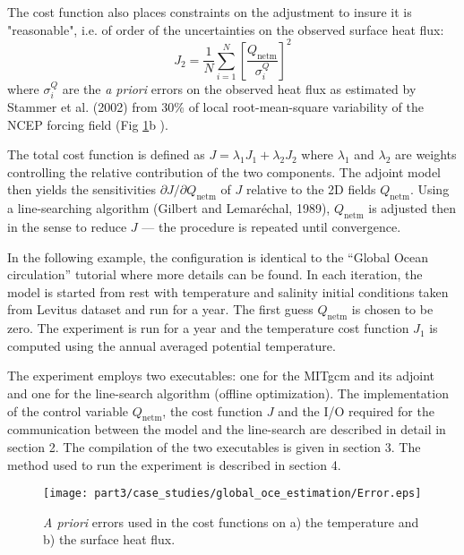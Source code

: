The cost function also places constraints on the adjustment to insure it is
"reasonable", i.e. of order of the uncertainties on the observed surface heat
flux: 
\begin{equation}
J_2 = \frac{1}{N} \sum_{i=1}^N \left[\frac{Q_\mathrm{netm}}{\sigma^Q_i} \right]^2
\end{equation}
where $\sigma^Q_i$ are the {\it a priori} errors on the observed heat flux as
estimated by Stammer et al. (2002) from 30\% of local root-mean-square
variability of the NCEP forcing field (Fig \ref{Error}b ).

The total cost function is defined as $J=\lambda_1 J_1+ \lambda_2 J_2$ where
$\lambda_1$ and $\lambda_2$ are weights controlling the relative contribution
of the two components. The adjoint model then yields the sensitivities
$\partial J/\partial Q_\mathrm{netm}$ of $J$ relative to the 2D fields
$Q_\mathrm{netm}$. Using a line-searching algorithm (Gilbert and
Lemar\'{e}chal, 1989), $Q_\mathrm{netm}$ is adjusted then in the sense to
reduce $J$ --- the procedure is repeated until convergence.

In the following example, the configuration is identical to the ``Global Ocean
circulation'' tutorial where more details can be found. In each iteration, the
model is started from rest with temperature and salinity initial conditions
taken from Levitus dataset and run for a year. The first guess
$Q_\mathrm{netm}$ is chosen to be zero. The experiment is run for a year
and the temperature cost function $J_1$ is computed using the annual averaged
potential temperature.

The experiment employs two executables: one for the MITgcm and its adjoint and
one for the line-search algorithm (offline optimization). The implementation
of the control variable $Q_\mathrm{netm}$, the cost function $J$ and the I/O
required for the communication between the model and the line-search are
described in detail in section 2. The compilation of the two executables is
given in section 3. The method used to run the experiment is described in
section 4.

\begin{figure} [tpb]
\begin{center}
\texttt{[image: part3/case\_studies/global\_oce\_estimation/Error.eps]}
\caption{{\it A priori} errors used in the cost functions on a) the temperature and b) the surface heat flux.} 
\label{Error}
\end{center}
\end{figure}

